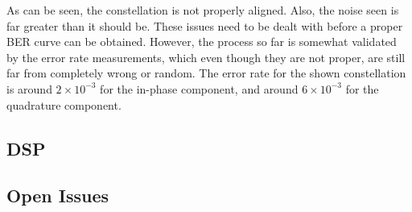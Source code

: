 \begin{refsection}
As can be seen, the constellation is not properly aligned. Also, the noise seen is far greater than it should be. These issues need to be dealt with before a proper BER curve can be obtained. However, the process so far is somewhat validated by the error rate measurements, which even though they are not proper, are still far from completely wrong or random. The error rate for the shown constellation is around $2 \times 10^{-3}$ for the in-phase component, and around $6 \times 10^{-3}$ for the quadrature component.

\subsection{DSP}

\subsection{Open Issues}

\newpage




\clearpage
\printbibliography[heading=subbibliography]
\end{refsection}
\cleardoublepage


